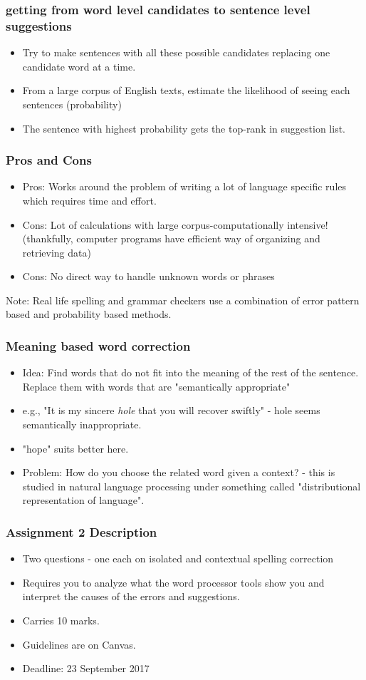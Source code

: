 \documentclass{beamer}
\begin{document}
\begin{frame}
\frametitle{getting from word level candidates to sentence level suggestions}
\begin{itemize}
\item Try to make sentences with all these possible candidates replacing one candidate word at a time.
\item From a large corpus of English texts, estimate the likelihood of seeing each sentences (probability)
\item The sentence with highest probability gets the top-rank in suggestion list.
\end{itemize}
\end{frame}

\begin{frame}
\frametitle{Pros and Cons}
\begin{itemize}
\item Pros: Works around the problem of writing a lot of language specific rules which requires time and effort. 
\item Cons: Lot of calculations with large corpus-computationally intensive! (thankfully, computer programs have efficient way of organizing and retrieving data)
\item Cons: No direct way to handle unknown words or phrases 
\end{itemize}
Note: Real life spelling and grammar checkers use a combination of error pattern based and probability based methods.
\end{frame}

\begin{frame}
\frametitle{Meaning based word correction}
\begin{itemize}
\item Idea: Find words that do not fit into the meaning of the rest of the sentence. Replace them with words that are "semantically appropriate"
\item e.g., "It is my sincere \textit{hole} that you will recover swiftly" - hole seems semantically inappropriate.
\item "hope" suits better here. 
\item Problem: How do you choose the related word given a context? - this is studied in natural language processing under something called "distributional representation of language".
\end{itemize}
\end{frame}

\begin{frame}
\frametitle{Assignment 2 Description}
\begin{itemize}
\item Two questions - one each on isolated and contextual spelling correction
\item Requires you to analyze what the word processor tools show you and interpret the causes of the errors and suggestions.
\item Carries 10 marks.
\item Guidelines are on Canvas. 
\item Deadline: 23 September 2017
\end{itemize}
\end{frame}
\end{document}
